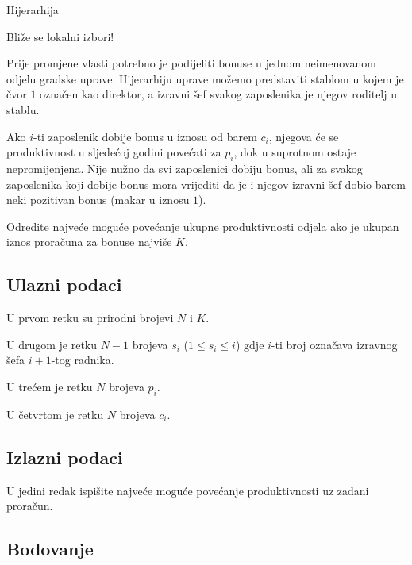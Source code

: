 \begin{statement}[
  problempoints=100,
  timelimit=1 sekunda,
  memorylimit=1024 MiB,
]{Hijerarhija}\

Bliže se lokalni izbori!

Prije promjene vlasti potrebno je podijeliti bonuse u jednom neimenovanom odjelu gradske uprave. Hijerarhiju uprave možemo predstaviti stablom u kojem je čvor $1$ označen kao direktor, a izravni šef svakog zaposlenika je njegov roditelj u stablu.

Ako $i$-ti zaposlenik dobije bonus u iznosu od barem $c_i$, njegova će se produktivnost u sljedećoj godini povećati za $p_i$, dok u suprotnom ostaje nepromijenjena. Nije nužno da svi zaposlenici dobiju bonus, ali za svakog zaposlenika koji dobije bonus mora vrijediti da je i njegov izravni šef dobio barem neki pozitivan bonus (makar u iznosu $1$).

Odredite najveće moguće povećanje ukupne produktivnosti odjela ako je ukupan iznos proračuna za bonuse najviše $K$.

\subsection*{Ulazni podaci}

U prvom retku su prirodni brojevi $N$ i $K$.

U drugom je retku $N - 1$ brojeva $s_i$ ($1 \leq s_i \leq i$) gdje $i$-ti broj označava izravnog šefa $i+1$-tog radnika.

U trećem je retku $N$ brojeva $p_i$.

U četvrtom je retku $N$ brojeva $c_i$. 

\subsection*{Izlazni podaci}

U jedini redak ispišite najveće moguće povećanje produktivnosti uz zadani proračun.

\subsection*{Bodovanje}


\end{statement}
